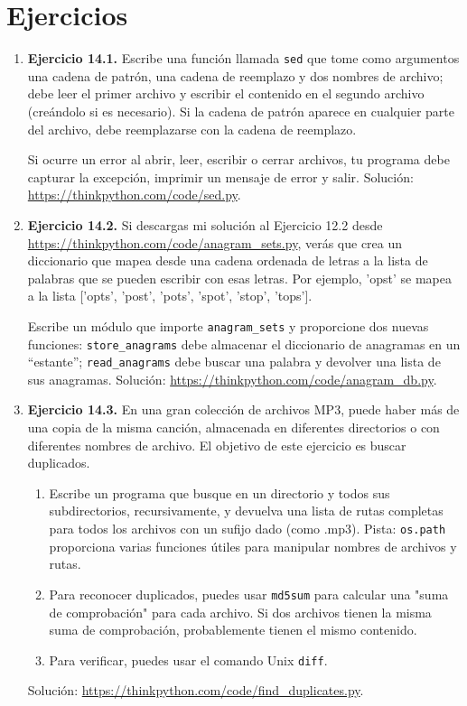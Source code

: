 \section{Ejercicios}

\begin{enumerate}
\item \textbf{Ejercicio 14.1.} Escribe una función llamada \texttt{sed} que tome como argumentos una cadena de patrón, una cadena de reemplazo y dos nombres de archivo; debe leer el primer archivo y escribir el contenido en el segundo archivo (creándolo si es necesario). Si la cadena de patrón aparece en cualquier parte del archivo, debe reemplazarse con la cadena de reemplazo.

Si ocurre un error al abrir, leer, escribir o cerrar archivos, tu programa debe capturar la excepción, imprimir un mensaje de error y salir. Solución: \url{https://thinkpython.com/code/sed.py}.

\item \textbf{Ejercicio 14.2.} Si descargas mi solución al Ejercicio 12.2 desde \url{https://thinkpython.com/code/anagram_sets.py}, verás que crea un diccionario que mapea desde una cadena ordenada de letras a la lista de palabras que se pueden escribir con esas letras. Por ejemplo, 'opst' se mapea a la lista ['opts', 'post', 'pots', 'spot', 'stop', 'tops'].

Escribe un módulo que importe \texttt{anagram\_sets} y proporcione dos nuevas funciones: \texttt{store\_anagrams} debe almacenar el diccionario de anagramas en un ``estante''; \texttt{read\_anagrams} debe buscar una palabra y devolver una lista de sus anagramas. Solución: \url{https://thinkpython.com/code/anagram_db.py}.

\item \textbf{Ejercicio 14.3.} En una gran colección de archivos MP3, puede haber más de una copia de la misma canción, almacenada en diferentes directorios o con diferentes nombres de archivo. El objetivo de este ejercicio es buscar duplicados.

\begin{enumerate}
\item Escribe un programa que busque en un directorio y todos sus subdirectorios, recursivamente, y devuelva una lista de rutas completas para todos los archivos con un sufijo dado (como .mp3). Pista: \texttt{os.path} proporciona varias funciones útiles para manipular nombres de archivos y rutas.

\item Para reconocer duplicados, puedes usar \texttt{md5sum} para calcular una "suma de comprobación" para cada archivo. Si dos archivos tienen la misma suma de comprobación, probablemente tienen el mismo contenido.

\item Para verificar, puedes usar el comando Unix \texttt{diff}.
\end{enumerate}

Solución: \url{https://thinkpython.com/code/find_duplicates.py}.
\end{enumerate}